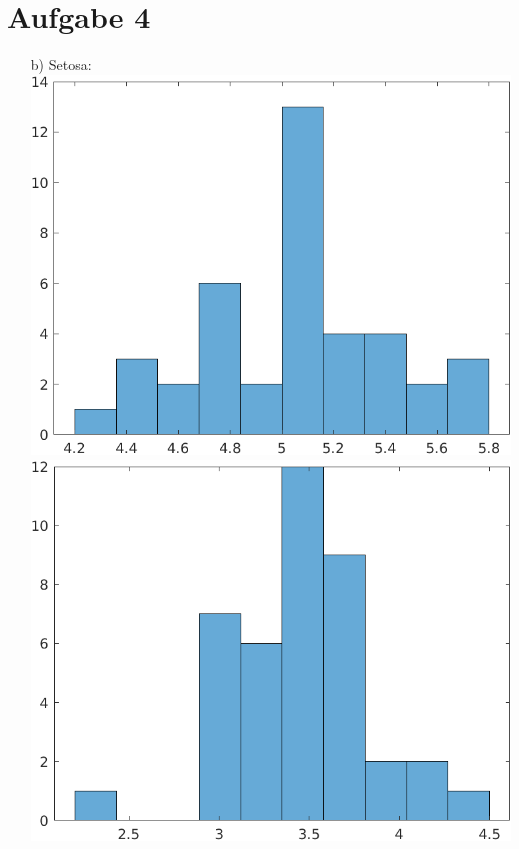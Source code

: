 \documentclass[a4paper]{scrartcl}
\begin{document}
	\section*{Aufgabe 4}
	\begin{itemize}
		\item[b)] Setosa:\\
		\includegraphics*[scale=0.2]{assignment2_data/plots/setosa_sl.png}
		\includegraphics*[scale=0.2]{assignment2_data/plots/setosa_sb.png}

\end{itemize}
\end{document}
